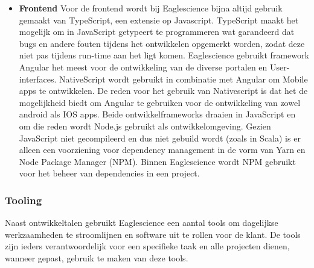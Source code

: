 \begin{itemize}
    \item \textbf{Frontend}
    Voor de frontend wordt bij Eaglescience bijna altijd gebruik gemaakt van TypeScript, een extensie op Javascript. TypeScript maakt het mogelijk om in JavaScript getypeert te programmeren wat garandeerd dat bugs en andere fouten tijdens het ontwikkelen opgemerkt worden, zodat deze niet pas tijdens run-time aan het ligt komen. Eaglescience gebruikt framework Angular het meest voor de ontwikkeling van de diverse portalen en User-interfaces. NativeScript wordt gebruikt in combinatie met Angular om Mobile apps te ontwikkelen. De reden voor het gebruik van Nativescript is dat het de mogelijkheid biedt om Angular te gebruiken voor de ontwikkeling van zowel android als IOS apps. Beide ontwikkelframeworks draaien in JavaScript en om die reden wordt Node.js gebruikt als ontwikkelomgeving. Gezien JavaScript niet gecompileerd en dus niet gebuild wordt (zoals in Scala) is er alleen een voorziening voor dependency management in de vorm van Yarn en Node Package Manager (NPM). Binnen Eaglescience wordt NPM gebruikt voor het beheer van dependencies in een project.
\end{itemize}

\subsubsection{Tooling}\label{subsubsec:tooling}
Naast ontwikkeltalen gebruikt Eaglescience een aantal tools om dagelijkse werkzaamheden te stroomlijnen en software uit te rollen voor de klant. De tools zijn ieders verantwoordelijk voor een specifieke taak en alle projecten dienen, wanneer gepast, gebruik te maken van deze tools.

